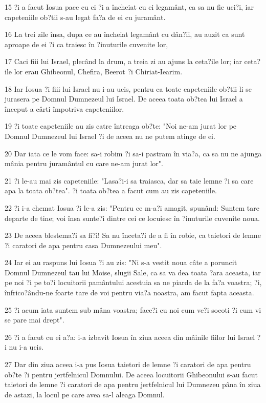 \par 15 ?i a facut Iosua pace cu ei ?i a încheiat cu ei legamânt, ca sa nu fie uci?i, iar capeteniile ob?tii s-au legat fa?a de ei cu juramânt.
\par 16 La trei zile însa, dupa ce au încheiat legamânt cu dân?ii, au auzit ca sunt aproape de ei ?i ca traiesc în ?inuturile cuvenite lor,
\par 17 Caci fiii lui Israel, plecând la drum, a treia zi au ajuns la ceta?ile lor; iar ceta?ile lor erau Ghibeonul, Chefira, Beerot ?i Chiriat-Iearim.
\par 18 Iar Iosua ?i fiii lui Israel nu i-au ucis, pentru ca toate capeteniile ob?tii li se jurasera pe Domnul Dumnezeul lui Israel. De aceea toata ob?tea lui Israel a început a cârti împotriva capeteniilor.
\par 19 ?i toate capeteniile au zis catre întreaga ob?te: "Noi ne-am jurat lor pe Domnul Dumnezeul lui Israel ?i de aceea nu ne putem atinge de ei.
\par 20 Dar iata ce le vom face: sa-i robim ?i sa-i pastram în via?a, ca sa nu ne ajunga mânia pentru juramântul cu care ne-am jurat lor".
\par 21 ?i le-au mai zis capeteniile: "Lasa?i-i sa traiasca, dar sa taie lemne ?i sa care apa la toata ob?tea". ?i toata ob?tea a facut cum au zis capeteniile.
\par 22 ?i i-a chemat Iosua ?i le-a zis: "Pentru ce m-a?i amagit, spunând: Suntem tare departe de tine; voi însa sunte?i dintre cei ce locuiesc în ?inuturile cuvenite noua.
\par 23 De aceea blestema?i sa fi?i! Sa nu înceta?i de a fi în robie, ca taietori de lemne ?i caratori de apa pentru casa Dumnezeului meu".
\par 24 Iar ei au raspuns lui Iosua ?i au zis: "Ni s-a vestit noua câte a poruncit Domnul Dumnezeul tau lui Moise, slugii Sale, ca sa va dea toata ?ara aceasta, iar pe noi ?i pe to?i locuitorii pamântului acestuia sa ne piarda de la fa?a voastra; ?i, înfrico?ându-ne foarte tare de voi pentru via?a noastra, am facut fapta aceasta.
\par 25 ?i acum iata suntem sub mâna voastra; face?i cu noi cum ve?i socoti ?i cum vi se pare mai drept".
\par 26 ?i a facut cu ei a?a: i-a izbavit Iosua în ziua aceea din mâinile fiilor lui Israel ?i nu i-a ucis.
\par 27 Dar din ziua aceea i-a pus Iosua taietori de lemne ?i caratori de apa pentru ob?te ?i pentru jertfelnicul Domnului. De aceea locuitorii Ghibeonului s-au facut taietori de lemne ?i caratori de apa pentru jertfelnicul lui Dumnezeu pâna în ziua de astazi, la locul pe care avea sa-l aleaga Domnul.

